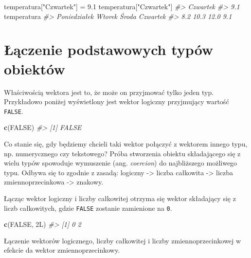 \documentclass[paper=6in:9in,pagesize=pdftex,headinclude=on,footinclude=on,10pt]{scrbook}
\newenvironment{Shaded}{\begin{snugshade}}{\end{snugshade}}
\newcommand{\CommentTok}[1]{\textcolor[rgb]{0.56,0.35,0.01}{\textit{#1}}}
\newcommand{\FloatTok}[1]{\textcolor[rgb]{0.00,0.00,0.81}{#1}}
\newcommand{\KeywordTok}[1]{\textcolor[rgb]{0.13,0.29,0.53}{\textbf{#1}}}
\newcommand{\NormalTok}[1]{#1}
\newcommand{\OtherTok}[1]{\textcolor[rgb]{0.56,0.35,0.01}{#1}}
\newcommand{\StringTok}[1]{\textcolor[rgb]{0.31,0.60,0.02}{#1}}
\begin{document}
\begin{Shaded}
\begin{Highlighting}[]
\NormalTok{temperatura[}\StringTok{"Czwartek"}\NormalTok{] =}\StringTok{ }\FloatTok{9.1}
\NormalTok{temperatura[}\StringTok{"Czwartek"}\NormalTok{]}
\CommentTok{#> Czwartek }
\CommentTok{#>      9.1}
\NormalTok{temperatura}
\CommentTok{#> Poniedziałek       Wtorek        Środa     Czwartek }
\CommentTok{#>          8.2         10.3         12.0          9.1}
\end{Highlighting}
\end{Shaded}

\hypertarget{lpto-vector}{%
\section{Łączenie podstawowych typów obiektów}\label{lpto-vector}}

Właściwością wektora jest to, że może on przyjmować tylko jeden typ.
Przykładowo poniżej wyświetlony jest wektor logiczny przyjmujący wartość \texttt{FALSE}.

\begin{Shaded}
\begin{Highlighting}[]
\KeywordTok{c}\NormalTok{(}\OtherTok{FALSE}\NormalTok{)}
\CommentTok{#> [1] FALSE}
\end{Highlighting}
\end{Shaded}

Co stanie się, gdy będziemy chcieli taki wektor połączyć z wektorem innego typu, np. numerycznego czy tekstowego?
Próba stworzenia obiektu składającego się z wielu typów spowoduje wymuszenie (ang. \emph{coercion}) do najbliższego możliwego typu.
Odbywa się to zgodnie z zasadą: logiczny -\textgreater{} liczba całkowita -\textgreater{} liczba zmiennoprzecinkowa -\textgreater{} znakowy.

Łącząc wektor logiczny i liczby całkowitej otrzyma się wektor składający się z liczb całkowitych, gdzie \texttt{FALSE} zostanie zamienione na \texttt{0}.

\begin{Shaded}
\begin{Highlighting}[]
\KeywordTok{c}\NormalTok{(}\OtherTok{FALSE}\NormalTok{, 2L)}
\CommentTok{#> [1] 0 2}
\end{Highlighting}
\end{Shaded}

Łączenie wektorów logicznego, liczby całkowitej i liczby zmiennoprzecinkowej w efekcie da wektor zmiennoprzecinkowy.
\end{document}
